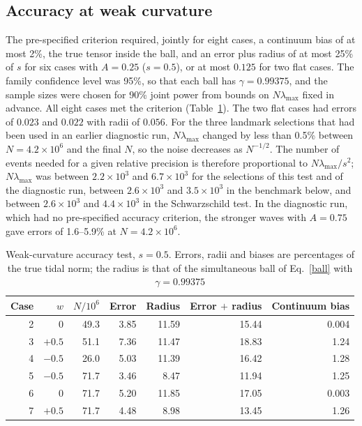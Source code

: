 \documentclass[11pt,a4paper]{article}
\begin{document}
\subsection{Accuracy at weak curvature}
The pre-specified criterion required, jointly for eight cases, a continuum
bias of at most 2\%, the true tensor inside the ball, and an error plus
radius of at most 25\% of $s$ for six cases with $A=0.25$ ($s=0.5$), or at
most $0.125$ for two flat cases. The family confidence level was 95\%, so
that each ball has $\gamma=0.99375$, and the sample sizes were chosen for
90\% joint power from bounds on $N\lambda_{\max}$ fixed in advance. All
eight cases met the criterion (Table~\ref{accuracy}). The two flat cases had
errors of $0.023$ and $0.022$ with radii of $0.056$. For the three landmark
selections that had been used in an earlier diagnostic run,
$N\lambda_{\max}$ changed by less than 0.5\% between $N=4.2\times10^6$ and
the final $N$, so the noise decreases as $N^{-1/2}$. The number of events
needed for a given relative precision is therefore proportional to
$N\lambda_{\max}/s^2$; $N\lambda_{\max}$ was between $2.2\times10^3$ and
$6.7\times10^3$ for the selections of this test and of the diagnostic run,
between $2.6\times10^3$ and $3.5\times10^3$ in the benchmark below, and
between $2.6\times10^3$ and $4.4\times10^3$ in the Schwarzschild test. In
the diagnostic run, which had no pre-specified accuracy criterion, the
stronger waves with $A=0.75$ gave errors of 1.6--5.9\% at
$N=4.2\times10^6$.

\begin{table}[t]
\centering\small
\caption{Weak-curvature accuracy test, $s=0.5$. Errors, radii and biases
are percentages of the true tidal norm; the radius is that of the
simultaneous ball of Eq.~\eqref{ball} with $\gamma=0.99375$}
\label{accuracy}
\begin{tabular}{rrrrrrr}
\toprule
Case & $w$ & $N/10^6$ & Error & Radius & Error $+$ radius & Continuum bias\\
\midrule
2 & $0$ & 49.3 & 3.85 & 11.59 & 15.44 & 0.004\\
3 & $+0.5$ & 51.1 & 7.36 & 11.47 & 18.83 & 1.24\\
4 & $-0.5$ & 26.0 & 5.03 & 11.39 & 16.42 & 1.28\\
5 & $-0.5$ & 71.7 & 3.46 & 8.47 & 11.94 & 1.25\\
6 & $0$ & 71.7 & 5.20 & 11.85 & 17.05 & 0.003\\
7 & $+0.5$ & 71.7 & 4.48 & 8.98 & 13.45 & 1.26\\
\bottomrule
\end{tabular}
\end{table}
\end{document}
